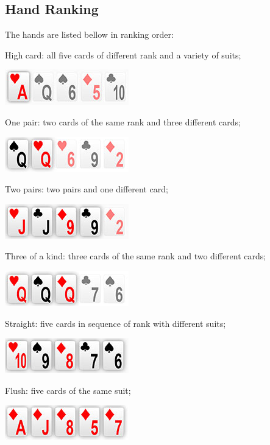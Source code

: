 \subsection{Hand Ranking}

The hands are listed bellow in ranking order:

High card: all five cards of different rank and a variety of suits;

\includegraphics[scale=2]{high-card}

One pair: two cards of the same rank and three different cards;
  
\includegraphics[scale=2]{pair}

Two pairs: two pairs and one different card;

\includegraphics[scale=2]{two-pairs}
  
Three of a kind: three cards of the same rank and two different cards;
  
\includegraphics[scale=2]{three-of-a-kind}

Straight: five cards in sequence of rank with different suits;
  
\includegraphics[scale=2]{straight}
  
Flush: five cards of the same suit;
  
\includegraphics[scale=2]{flush}
  

